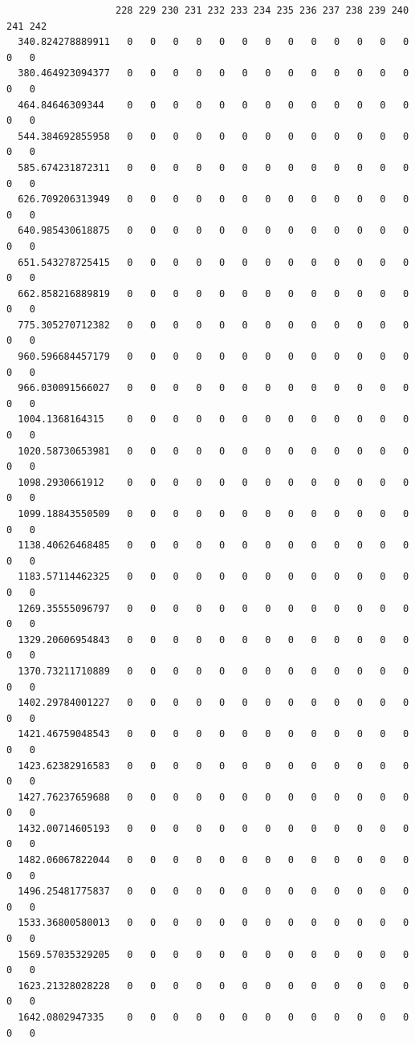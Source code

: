 \documentclass[
  letterpaper,
  DIV=11,
  numbers=noendperiod]{scrartcl}
\begin{document}
\begin{verbatim}
                   228 229 230 231 232 233 234 235 236 237 238 239 240 241 242
  340.824278889911   0   0   0   0   0   0   0   0   0   0   0   0   0   0   0
  380.464923094377   0   0   0   0   0   0   0   0   0   0   0   0   0   0   0
  464.84646309344    0   0   0   0   0   0   0   0   0   0   0   0   0   0   0
  544.384692855958   0   0   0   0   0   0   0   0   0   0   0   0   0   0   0
  585.674231872311   0   0   0   0   0   0   0   0   0   0   0   0   0   0   0
  626.709206313949   0   0   0   0   0   0   0   0   0   0   0   0   0   0   0
  640.985430618875   0   0   0   0   0   0   0   0   0   0   0   0   0   0   0
  651.543278725415   0   0   0   0   0   0   0   0   0   0   0   0   0   0   0
  662.858216889819   0   0   0   0   0   0   0   0   0   0   0   0   0   0   0
  775.305270712382   0   0   0   0   0   0   0   0   0   0   0   0   0   0   0
  960.596684457179   0   0   0   0   0   0   0   0   0   0   0   0   0   0   0
  966.030091566027   0   0   0   0   0   0   0   0   0   0   0   0   0   0   0
  1004.1368164315    0   0   0   0   0   0   0   0   0   0   0   0   0   0   0
  1020.58730653981   0   0   0   0   0   0   0   0   0   0   0   0   0   0   0
  1098.2930661912    0   0   0   0   0   0   0   0   0   0   0   0   0   0   0
  1099.18843550509   0   0   0   0   0   0   0   0   0   0   0   0   0   0   0
  1138.40626468485   0   0   0   0   0   0   0   0   0   0   0   0   0   0   0
  1183.57114462325   0   0   0   0   0   0   0   0   0   0   0   0   0   0   0
  1269.35555096797   0   0   0   0   0   0   0   0   0   0   0   0   0   0   0
  1329.20606954843   0   0   0   0   0   0   0   0   0   0   0   0   0   0   0
  1370.73211710889   0   0   0   0   0   0   0   0   0   0   0   0   0   0   0
  1402.29784001227   0   0   0   0   0   0   0   0   0   0   0   0   0   0   0
  1421.46759048543   0   0   0   0   0   0   0   0   0   0   0   0   0   0   0
  1423.62382916583   0   0   0   0   0   0   0   0   0   0   0   0   0   0   0
  1427.76237659688   0   0   0   0   0   0   0   0   0   0   0   0   0   0   0
  1432.00714605193   0   0   0   0   0   0   0   0   0   0   0   0   0   0   0
  1482.06067822044   0   0   0   0   0   0   0   0   0   0   0   0   0   0   0
  1496.25481775837   0   0   0   0   0   0   0   0   0   0   0   0   0   0   0
  1533.36800580013   0   0   0   0   0   0   0   0   0   0   0   0   0   0   0
  1569.57035329205   0   0   0   0   0   0   0   0   0   0   0   0   0   0   0
  1623.21328028228   0   0   0   0   0   0   0   0   0   0   0   0   0   0   0
  1642.0802947335    0   0   0   0   0   0   0   0   0   0   0   0   0   0   0

\end{verbatim}
\end{document}
